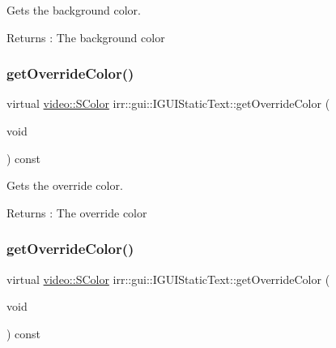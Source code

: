 Gets the background color. 

\begin{DoxyReturn}{Returns}
\+: The background color 
\end{DoxyReturn}
\mbox{\label{classirr_1_1gui_1_1IGUIStaticText_a9c4c43f262efd02a113da79bedb973e1}} 
\subsubsection{\texorpdfstring{get\+Override\+Color()}{getOverrideColor()}\hspace{0.1cm}{\footnotesize\ttfamily [1/2]}}
{\footnotesize\ttfamily virtual \hyperlink{classirr_1_1video_1_1SColor}{video\+::\+S\+Color} irr\+::gui\+::\+I\+G\+U\+I\+Static\+Text\+::get\+Override\+Color (\begin{DoxyParamCaption}\item[{void}]{ }\end{DoxyParamCaption}) const\hspace{0.3cm}{\ttfamily [pure virtual]}}



Gets the override color. 

\begin{DoxyReturn}{Returns}
\+: The override color 
\end{DoxyReturn}
\mbox{\label{classirr_1_1gui_1_1IGUIStaticText_a9c4c43f262efd02a113da79bedb973e1}} 
\subsubsection{\texorpdfstring{get\+Override\+Color()}{getOverrideColor()}\hspace{0.1cm}{\footnotesize\ttfamily [2/2]}}
{\footnotesize\ttfamily virtual \hyperlink{classirr_1_1video_1_1SColor}{video\+::\+S\+Color} irr\+::gui\+::\+I\+G\+U\+I\+Static\+Text\+::get\+Override\+Color (\begin{DoxyParamCaption}\item[{void}]{ }\end{DoxyParamCaption}) const\hspace{0.3cm}{\ttfamily [pure virtual]}}



